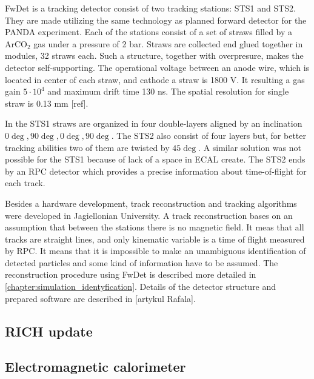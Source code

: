 FwDet is a tracking detector consist of two tracking stations: STS1 and STS2. They are made utilizing the same technology as planned forward detector for the PANDA experiment. Each of the stations consist of a set of straws filled by a ArCO$_2$ gas under a pressure of 2 bar. Straws are collected end glued together in modules, 32 straws each. Such a structure, together with overpresure, makes the detector self-supporting. The operational voltage between an anode wire, which is located in center of each straw, and cathode a straw is 1800 V. It resulting a gas gain $5 \cdot 10^4$ and maximum drift time 130 ns. The spatial resolution for single straw is 0.13 mm [ref].

In the STS1 straws are organized in four double-layers aligned by an inclination $0\deg, 90\deg, 0\deg, 90\deg$. The STS2 also consist of four layers but, for better tracking abilities two of them are twisted by $45\deg$. A similar solution was not possible for the STS1 because of lack of a space in ECAL create. The STS2 ends by an RPC detector which provides a precise information about time-of-flight for each track.

Besides a hardware development, track reconstruction and tracking algorithms were developed in Jagiellonian University. A track reconstruction bases on an assumption that between the stations there is no magnetic field. It meas that all tracks are straight lines, and only kinematic variable is a time of flight measured by RPC. It means that it is impossible to make an unambiguous identification of detected particles and some kind of information have to be assumed. The reconstruction procedure using FwDet is described more detailed in \ref{chapter:simulation_identyfication}. Details of the detector structure and prepared software are described in [artykul Rafala]. 
\subsection{RICH update}

\subsection{Electromagnetic calorimeter}

